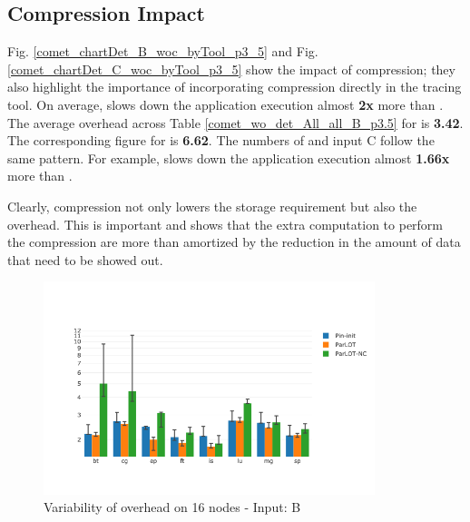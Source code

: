 \subsection{Compression Impact} 
\label{subsec:compact}

Fig. \ref{comet_chartDet_B_woc_byTool_p3_5} and Fig. \ref{comet_chartDet_C_woc_byTool_p3_5} show the 
impact of compression; they also highlight the importance of incorporating compression directly in the tracing
tool. 
%
On average, \parlotnc slows down the application execution almost \textbf{2x} more than \parlota. 
%
The average overhead 
across Table \ref{comet_wo_det_All_all_B_p3.5} for \parlota is \textbf{3.42}.
%
The  corresponding figure for \parlotnc is \textbf{6.62}. 
%
The numbers of \parlotm and input C  follow the same pattern. For example, \parlotnc slows down the application execution almost \textbf{1.66x} more than \parlotm.
%

Clearly, compression not only lowers the storage requirement but also the overhead. This is important and shows that the extra computation to perform the compression are more than amortized by the reduction in the amount of data that need to be showed out.



\begin{figure}[t]
\centering
\includegraphics[width=3.8in]{figs.comet.newMed/comet_BX2_Main_16_B_p3_5.png}
\caption{ Variability of \parlotm overhead on 16 nodes - Input: B}
\label{comet_BX2_Main_16_B_p3_5}
\end{figure}



